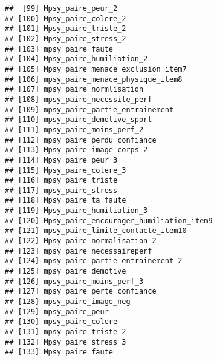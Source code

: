 \documentclass[
]{article}
\begin{document}
\begin{verbatim}
##  [99] Mpsy_paire_peur_2                                                
## [100] Mpsy_paire_colere_2                                              
## [101] Mpsy_paire_triste_2                                              
## [102] Mpsy_paire_stress_2                                              
## [103] mpsy_paire_faute                                                 
## [104] Mpsy_paire_humiliation_2                                         
## [105] Mpsy_paire_menace_exclusion_item7                                
## [106] mpsy_paire_menace_physique_item8                                 
## [107] mpsy_paire_normlisation                                          
## [108] mpsy_paire_necessite_perf                                        
## [109] mpsy_paire_partie_entrainement                                   
## [110] mpsy_paire_demotive_sport                                        
## [111] mpsy_paire_moins_perf_2                                          
## [112] mpsy_paire_perdu_confiance                                       
## [113] Mpsy_paire_image_corps_2                                         
## [114] Mpsy_paire_peur_3                                                
## [115] Mpsy_paire_colere_3                                              
## [116] mpsy_paire_triste                                                
## [117] mpsy_paire_stress                                                
## [118] Mpsy_paire_ta_faute                                              
## [119] Mpsy_paire_humiliation_3                                         
## [120] Mpsy_paire_encourager_humiliation_item9                          
## [121] mpsy_paire_limite_contacte_item10                                
## [122] Mpsy_paire_normalisation_2                                       
## [123] mpsy_paire_necessaireperf                                        
## [124] mpsy_paire_partie_entrainement_2                                 
## [125] mpsy_paire_demotive                                              
## [126] mpsy_paire_moins_perf_3                                          
## [127] mpsy_paire_perte_confiance                                       
## [128] mpsy_paire_image_neg                                             
## [129] mpsy_paire_peur                                                  
## [130] mpsy_paire_colere                                                
## [131] mpsy_paire_triste_2                                              
## [132] Mpsy_paire_stress_3                                              
## [133] Mpsy_paire_faute                                                 

\end{verbatim}
\end{document}
